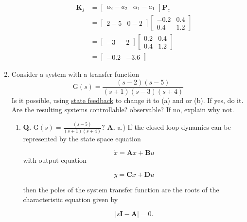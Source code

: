 \documentclass[main.tex]{subfiles}
\begin{document}
\begin{enumerate}
\begin{enumerate}
        $$
        \begin{aligned}
        \textbf{K}_f & =\left[\begin{array}{ll}
        a_2-a_2 & \alpha_1-a_1
        \end{array}\right] \textbf{P}_c \\
        & =\left[\begin{array}{ll}
        2-5 & 0-2
        \end{array}\right]\left[\begin{array}{cc}
        -0.2 & 0.4 \\
        0.4 & 1.2
        \end{array}\right] \\
        & =\left[\begin{array}{ll}
        -3 & -2
        \end{array}\right]\left[\begin{array}{ll}
        0.2 & 0.4 \\
        0.4 & 1.2
        \end{array}\right] \\
        & =\left[\begin{array}{ll}
        -0.2 & -3.6
        \end{array}\right]
        \end{aligned}
        $$
	\end{enumerate}
	
\item Consider a system with a transfer function 
$$\mathrm{G}(s)=\frac{(s-2)(s-5)}{(s+1)(s-3)(s+4)}$$
Is it possible, using \underline{state feedback} to change it to (a) and or (b). If yes, do it. Are the resulting systems controllable? observable? If no, explain why not.

    \begin{enumerate}
        \item \textbf{Q.} $\mathrm{G}(s)=\frac{(s-5)}{(s+1)(s+4)}$?
        \textbf{A.} a.) If the closed-loop dynamics can be represented by the state space equation 
        
        $$\dot{x} = \mathbf{A} x + \mathbf{B} u$$
        with output equation 
        
        $$y = \mathbf{C} x + \mathbf{D} u$$ 
        
        then the poles of the system transfer function are the roots of the characteristic equation given by 
        
        $$|s \mathbf{I}-\mathbf{A}|=0.$$ 
        

\end{enumerate}
\end{enumerate}
\end{document}
